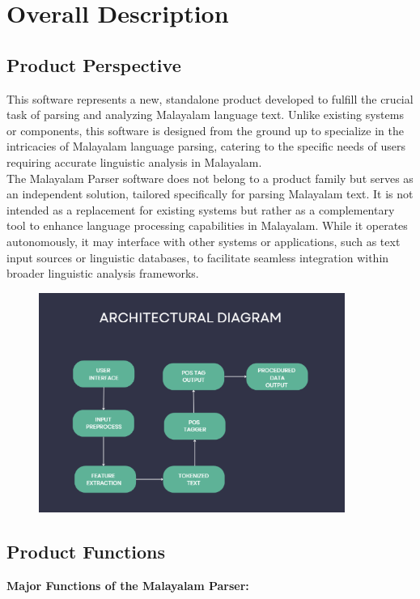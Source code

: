 \documentclass[12pt]{article}
\begin{document}
	\section{Overall Description}
	
	\subsection{Product Perspective}
	This software represents a new, standalone product
	developed to fulfill the crucial task of parsing and analyzing Malayalam language text.
	Unlike existing systems or components, this software is designed from the ground up to
	specialize in the intricacies of Malayalam language parsing, catering to the specific needs
	of users requiring accurate linguistic analysis in Malayalam.\\
	The Malayalam Parser software does not belong to a product family but serves as an
	independent solution, tailored specifically for parsing Malayalam text. It is not intended as
	a replacement for existing systems but rather as a complementary tool to enhance
	language processing capabilities in Malayalam. While it operates autonomously, it may
	interface with other systems or applications, such as text input sources or linguistic
	databases, to facilitate seamless integration within broader linguistic analysis frameworks.
	
	\begin{figure}[t]
		\centering
		\includegraphics[width=10cm]{architecture.png}
		\bigskip
	\end{figure}
	
	\newpage
	\subsection{Product Functions}
	\textbf{Major Functions of the Malayalam Parser:}
	
\end{document}
